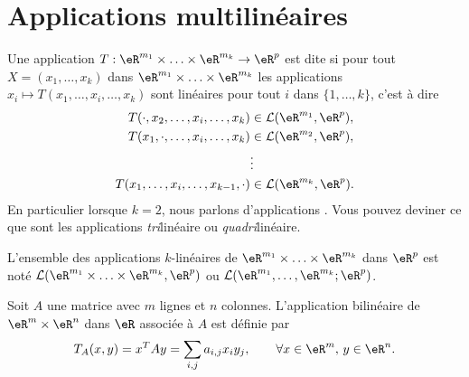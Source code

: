 \section{Applications multilinéaires}

\begin{definition}       \label{DefFRHooKnPCT}
    Une application $T: \eR^{m_1}\times \ldots \times\eR^{m_k}\to\eR^p $ est dite  si pour tout $X=(x_1, \ldots,x_k)$ dans $ \eR^{m_1}\times \ldots \times\eR^{m_k}$ les applications $x_i\mapsto T(x_1, \ldots, x_i,\ldots,x_k)$ sont linéaires pour tout $i$ dans $\{1,\ldots,k\}$, c'est à dire
	\begin{equation}
		\begin{aligned}[]
			T(\cdot,x_2, \ldots, x_i,\ldots,x_k)&\in \mathcal{L}(\eR^{m_1}, \eR^p),\\
			T(x_1,\cdot, \ldots, x_i,\ldots,x_k)&\in \mathcal{L}(\eR^{m_2}, \eR^p),\\
						& \vdots\\
			T(x_1, \ldots, x_i,\ldots,x_{k-1},\cdot)&\in \mathcal{L}(\eR^{m_k}, \eR^p).\\
		\end{aligned}
	\end{equation}
	En particulier lorsque $k=2$, nous parlons d'applications . Vous pouvez deviner ce que sont les applications \emph{tri}linéaire ou \emph{quadri}linéaire.
\end{definition}

L'ensemble des applications $k$-linéaires de $ \eR^{m_1}\times \ldots \times\eR^{m_k}$ dans $\eR^p$ est noté $\mathcal{L}(\eR^{m_1}\times \ldots \times\eR^{m_k}, \eR^p)$ ou $\mathcal{L}(\eR^{m_1}, \ldots,\eR^{m_k}; \eR^p)$.

\begin{example}
  Soit $A$ une matrice avec $m$ lignes et $n$ colonnes. L'application bilinéaire de $\eR^m\times \eR^n$ dans $\eR$ associée à $A$ est définie par
\[
T_A(x,y)= x^TAy=\sum_{i,j}a_{i,j}x_i y_j, \qquad \forall x\in \eR^m, \, y \in \eR^n.
\]
\end{example}

